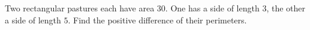 Two rectangular pastures each have area $30$. One has a side of length $3$, the other a side of length $5$. Find the positive difference of their perimeters.
